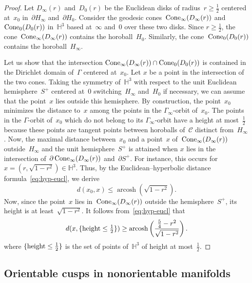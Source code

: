 \documentclass[11pt,reqno]{amsart}
\theoremstyle{definition}
\numberwithin{equation}{section}
\newcommand{\HH}{{\mathbb H}}
\DeclareMathOperator{\arcosh}{arcosh}
\DeclareMathOperator{\Cone}{{\rm Cone}}
\numberwithin{equation}{section}
\begin{document}
{\color{gray}

\begin{proof}
Let $D_\infty(r)$ and~$D_0(r)$ be the Euclidean disks of radius~$r \geq \frac{1}{2}$ centered at~$x_0$ in~$\partial H_\infty$ and~$\partial H_0$.
Consider the geodesic cones~$\Cone_\infty(D_\infty(r))$ and~$\Cone_0(D_0(r))$ in~$\HH^3$ based at~$\infty$ and~$0$ over these two disks.
Since $r \geq \frac{1}{2}$, the cone~$\Cone_\infty(D_\infty(r))$ contains the horoball~$H_0$.
Similarly, the cone~$\Cone_0(D_0(r))$ contains the horoball~$H_\infty$.

Let us show that the intersection $\Cone_\infty(D_\infty(r)) \cap \Cone_0(D_0(r))$ is contained in the Dirichlet domain of~$\Gamma$ centered at~$x_0$.
Let $x$ be a point in the intersection of the two cones.
Taking the symmetry of~$\HH^3$ with respect to the unit Euclidean hemisphere~$S^+$ centered at~$0$ switching~$H_\infty$ and~$H_0$ if necessary, we can assume that the point~$x$ lies outside this hemisphere.
By construction, the point~$x_0$ minimizes the distance to~$x$ among the points in the $\Gamma_\infty$-orbit of~$x_0$.
The points in the $\Gamma$-orbit of~$x_0$ which do not belong to its $\Gamma_\infty$-orbit have a height at most~$\frac{1}{2}$ because these points are tangent points between horoballs of~$\mathcal{C}$ distinct from~$H_\infty$.
Now, the maximal distance between~$x_0$ and a point~$x$ of~$\Cone_\infty(D_\infty(r))$ outside~$H_\infty$ and the unit hemisphere~$S^+$ is attained when $x$ lies in the intersection of~$\partial \Cone_\infty(D_\infty(r))$ and~$\partial S^+$.
For instance, this occurs for~$x=(r,\sqrt{1-r^2}) \in \HH^3$.
Thus, by the Euclidean--hyperbolic distance formula~\eqref{eq:hyp-eucl}, we derive
\[
d(x_0,x) \leq \arcosh \left( \sqrt{1-r^2} \right).
\]
Now, since the point~$x$ lies in~$\Cone_\infty(D_\infty(r))$ outside the hemisphere~$S^+$, its height is at least~$\sqrt{1-r^2}$.
It follows from~\eqref{eq:hyp-eucl} that 
\[
d(x,\{ {\rm height} \leq \tfrac{1}{2} \}) \geq \arcosh \left( \frac{ \frac{5}{4} -r^2}{\sqrt{1-r^2}} \right).
\]
where $\{ {\rm height} \leq \frac{1}{2} \}$ is the set of points of~$\HH^3$ of height at most~$\frac{1}{2}$.

\end{proof}

}

\forgotten



\subsection{Orientable cusps in nonorientable manifolds}
\end{document}
